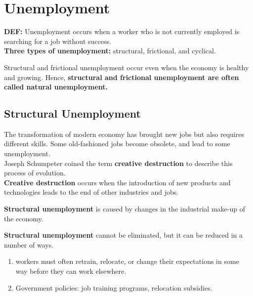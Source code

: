\documentclass[12pt]{article}
\title{}
\author{}
\date{}
\begin{document}
\section{Unemployment}

{\textbf {DEF:}} Unemployment occurs when a worker who is not currently employed is 
searching for a job without success.\\










{\textbf {Three types of unemployment:}} structural, frictional, and cyclical.

Structural and frictional unemployment occur even when the economy is healthy and
growing. Hence, {\textbf {structural and frictional unemployment are often called
natural unemployment.}}


\subsection{Structural Unemployment}
The transformation of modern economy has brought new jobs but also requires different
skills. Some old-fashioned jobs become obsolete, and lead to some unemployment.\\
Joseph Schumpeter coined the term {\textbf {creative destruction}} to describe this 
process of evolution.\\
{\textbf {Creative destruction}} occurs when the introduction of new products and 
technologies leads to the end of other industries and jobs.

{\textbf {Structural unemployment}} is caused by changes in the industrial make-up
of the economy.


{\textbf {Structural unemployment}} cannot be eliminated, but it can be reduced in a
number of ways.
\begin{enumerate}
\item workers must often retrain, relocate, or change their expectations in some way
		before they can work elsewhere.
\item Government policies: job training programs, relocation subsidies.
\end{enumerate}
\end{document}
